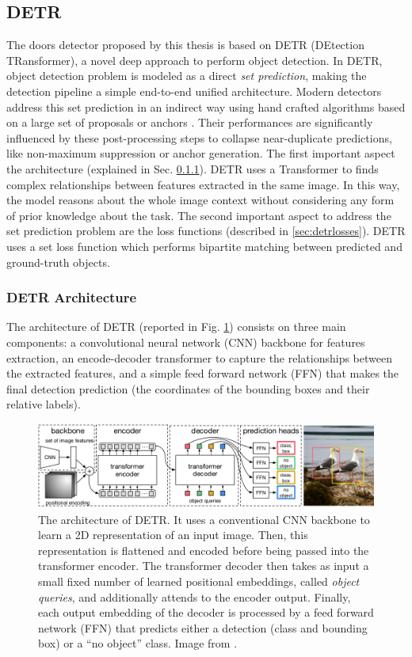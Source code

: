 \subsection{DETR}

The doors detector proposed by this thesis is based on DETR \cite{detr} (DEtection TRansformer), a novel deep approach to perform object detection. In DETR, object detection problem is modeled as a direct \textit{set prediction}, making the detection pipeline a simple end-to-end unified architecture. Modern detectors address this set prediction in an indirect way using hand crafted algorithms based on a large set of proposals \cite{yolo} or anchors \cite{focalloss}. Their performances are significantly influenced by these post-processing steps to collapse near-duplicate predictions, like non-maximum suppression or anchor generation. The first important aspect the architecture (explained in Sec. \ref{sec:detrarchitecture}). DETR uses a Transformer to finds complex relationships between features extracted in the same image. In this way, the model reasons about the whole image context without considering any form of prior knowledge about the task. The second important aspect to address the set prediction problem are the loss functions (described in \ref{sec:detrlosses}). DETR uses a set loss function which performs bipartite matching between predicted and ground-truth objects.

\subsubsection{DETR Architecture}
\label{sec:detrarchitecture}
The architecture of DETR (reported in Fig. \ref{fig:detrarchiecture}) consists on three main components: a convolutional neural network (CNN) backbone for features extraction, an encode-decoder transformer to capture the relationships between the extracted features, and a simple feed forward network (FFN) that makes the final detection prediction (the coordinates of the bounding boxes and their relative labels).

\begin{figure}[h!]
	\centering
	\includegraphics[width=\linewidth]{images/detrarchitecture.png}
	\caption{The architecture of DETR. It uses a conventional CNN backbone to learn a 2D representation of an input image. Then, this representation is flattened and encoded before being passed into the transformer encoder. The transformer decoder then takes as input a small fixed number of learned positional embeddings, called \textit{object queries}, and additionally attends to the encoder output. Finally, each output embedding of the decoder is processed by a  feed forward network (FFN) that predicts either a detection (class and bounding box) or a ``no object'' class. Image from \cite{detr}.}
	\label{fig:detrarchiecture}
\end{figure}

